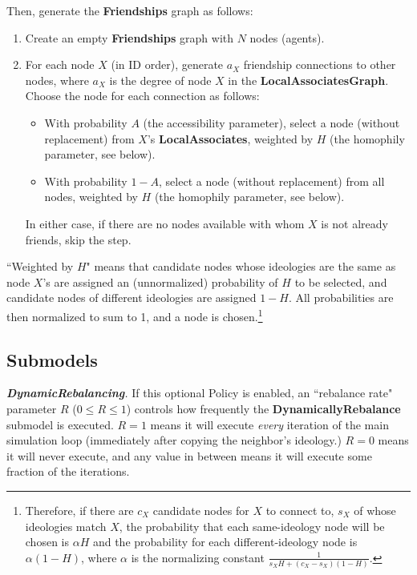 Then, generate the \textbf{Friendships} graph as follows:

\begin{enumerate}
\item Create an empty \textbf{Friendships} graph with $N$ nodes (agents).
\item For each node $X$ (in ID order), generate $a_X$ friendship connections
to other nodes, where $a_X$ is the degree of node $X$ in the
\textbf{LocalAssociatesGraph}. Choose the node for each connection as follows:
    \begin{itemize}
    \item With probability $A$ (the accessibility parameter), select a node
(without replacement) from $X$'s \textbf{LocalAssociates}, weighted by $H$
(the homophily parameter, see below).
    \item With probability $1-A$, select a node (without replacement) from all
nodes, weighted by $H$ (the homophily parameter, see below).
    \end{itemize}
    In either case, if there are no nodes available with whom $X$ is not
already friends, skip the step.
\end{enumerate}

``Weighted by $H$" means that candidate nodes whose ideologies are the same as
node $X$'s are assigned an (unnormalized) probability of $H$ to be selected,
and candidate nodes of different ideologies are assigned $1-H$. All
probabilities are then normalized to sum to 1, and a node is chosen.\footnote{
Therefore, if there are $c_X$ candidate nodes for $X$ to connect to, $s_X$ of
whose ideologies match $X$, the probability that each same-ideology node will
be chosen is $\alpha H$ and the probability for each different-ideology node
is $\alpha (1-H)$, where $\alpha$ is the normalizing constant $\frac{1}{s_X H
+ (c_X-s_X)(1-H)}$.}



\subsection{Submodels}

\textit{\textbf{DynamicRebalancing}.} If this optional Policy is enabled, an
``rebalance rate" parameter $R$ ($0 \leq R \leq 1$) controls how frequently
the \textbf{DynamicallyRebalance} submodel is executed. $R=1$ means it will
execute \textit{every} iteration of the main simulation loop (immediately
after copying the neighbor's ideology.) $R=0$ means it will never execute, and
any value in between means it will execute some fraction of the iterations.

